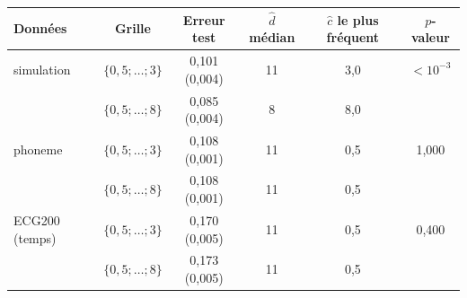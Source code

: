\begin{tabular}{@{}lccccc@{}}
\toprule
Données & Grille & Erreur test & $\hat d$ médian & $\hat c$ le plus fréquent & $p$-valeur \\
\midrule
simulation & $\{0{,}5;\dots;3\}$ & 0{,}101 (0{,}004) & 11 & 3{,}0 & $<10^{-3}$ \\
 & $\{0{,}5;\dots;8\}$ & 0{,}085 (0{,}004) & 8 & 8{,}0 &  \\
\addlinespace
phoneme & $\{0{,}5;\dots;3\}$ & 0{,}108 (0{,}001) & 11 & 0{,}5 & 1{,}000 \\
 & $\{0{,}5;\dots;8\}$ & 0{,}108 (0{,}001) & 11 & 0{,}5 &  \\
\addlinespace
ECG200 (temps) & $\{0{,}5;\dots;3\}$ & 0{,}170 (0{,}005) & 11 & 0{,}5 & 0{,}400 \\
 & $\{0{,}5;\dots;8\}$ & 0{,}173 (0{,}005) & 11 & 0{,}5 &  \\
\bottomrule
\end{tabular}
